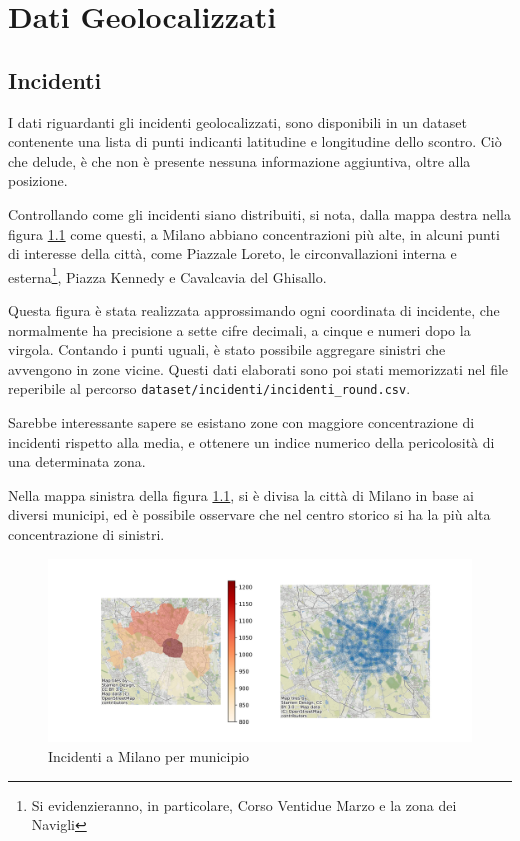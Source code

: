\documentclass[a4paper,12pt]{report}
\newcommand{\filenamestyle}[1]{\texttt{#1}}
\begin{document}
\chapter{Dati Geolocalizzati}

\section{Incidenti}

I dati riguardanti gli incidenti geolocalizzati, sono disponibili in un dataset 
contenente una lista di punti indicanti latitudine e longitudine dello scontro. 
Ciò che delude, è che non è presente nessuna informazione aggiuntiva, 
oltre alla posizione.

Controllando come gli incidenti siano distribuiti, 
si nota, dalla mappa destra nella figura \ref{fig:heatmap-municipi} come questi, 
a Milano abbiano concentrazioni più alte, 
in alcuni punti di interesse della città, come Piazzale Loreto, le circonvallazioni 
interna e esterna\footnote{Si evidenzieranno, in particolare, Corso Ventidue Marzo 
e la zona dei Navigli}, Piazza Kennedy e Cavalcavia del Ghisallo. 

Questa figura è stata realizzata approssimando ogni coordinata di incidente, che  
normalmente ha precisione a sette cifre decimali, a cinque e numeri dopo la virgola.
Contando i punti uguali, è stato possibile aggregare sinistri che avvengono in zone 
vicine. 
Questi dati elaborati sono poi stati memorizzati nel file reperibile al 
percorso \filenamestyle{dataset/incidenti/incidenti\_round.csv}.

Sarebbe interessante sapere se esistano zone con maggiore concentrazione 
di incidenti rispetto alla media, e ottenere un indice numerico 
della pericolosità di una determinata zona.

Nella mappa sinistra della figura \ref{fig:heatmap-municipi}, si è divisa 
la città di Milano in base ai diversi municipi, ed è possibile 
osservare che nel centro storico si ha la più alta concentrazione di sinistri.

\begin{figure}
    \includegraphics[width=\linewidth]{../src/municipi_milano/incidenti_municipio.png}
    \caption{Incidenti a Milano per municipio}
    \label{fig:heatmap-municipi}
\end{figure}
\end{document}
